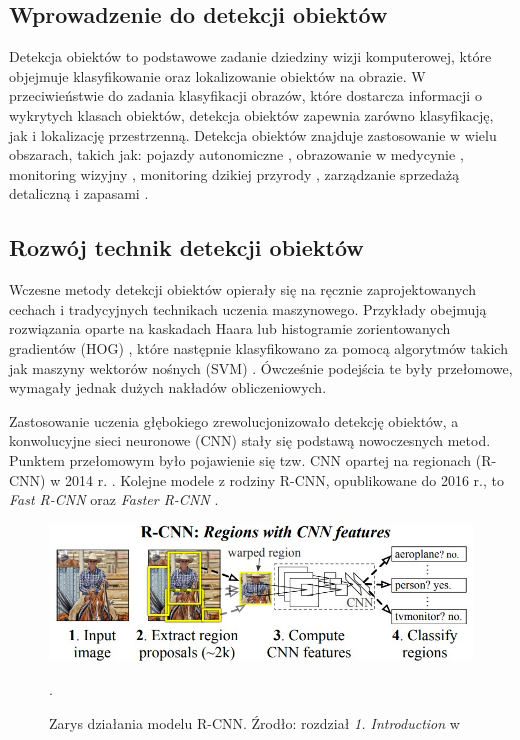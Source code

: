 \subsection{Wprowadzenie do detekcji obiektów}
Detekcja obiektów to podstawowe zadanie dziedziny wizji komputerowej, które objejmuje klasyfikowanie oraz lokalizowanie obiektów na obrazie. W przeciwieństwie do zadania klasyfikacji obrazów, które dostarcza informacji o wykrytych klasach obiektów, detekcja obiektów zapewnia zarówno klasyfikację, jak i lokalizację przestrzenną. Detekcja obiektów znajduje zastosowanie w wielu obszarach, takich jak: pojazdy autonomiczne \cite{pojazdy_autonomiczne}, obrazowanie w medycynie \cite{obrazowanie_w_medycynie}, monitoring wizyjny \cite{monitoring_wizyjny}, monitoring dzikiej przyrody \cite{wildlife}, zarządzanie sprzedażą detaliczną i zapasami \cite{sklepy}.

\subsection{Rozwój technik detekcji obiektów}
Wczesne metody detekcji obiektów opierały się na ręcznie zaprojektowanych cechach i tradycyjnych technikach uczenia maszynowego. Przykłady obejmują rozwiązania oparte na kaskadach Haara \cite{haar} lub histogramie zorientowanych gradientów (HOG) \cite{hog}, które następnie klasyfikowano za pomocą algorytmów takich jak maszyny wektorów nośnych (SVM) \cite{svm}. Ówcześnie podejścia te były przełomowe, wymagały jednak dużych nakładów obliczeniowych.

Zastosowanie uczenia głębokiego zrewolucjonizowało detekcję obiektów, a konwolucyjne sieci neuronowe (CNN) stały się podstawą nowoczesnych metod. Punktem przełomowym było pojawienie się tzw. CNN opartej na regionach (R-CNN) w 2014 r. \cite{RCNN}. Kolejne modele z rodziny R-CNN, opublikowane do 2016 r., to \emph{Fast R-CNN} \cite{Fast-RCNN} oraz \emph{Faster R-CNN} \cite{Faster-RCNN}.
\begin{figure}[H]
    \centering
    \includegraphics[width=\linewidth]{r_technologie/AI_assets/rcnn.png}
    \caption{Zarys działania modelu R-CNN. Źrodło: rozdział \emph{1. Introduction} w \cite{RCNN}}.
    \label{fig:R-CNN-schemat}
\end{figure}

